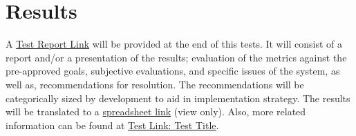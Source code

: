 
\section{Results}
\label{sec:sec011}

A \hyperlink{}{Test Report Link} will be provided at the end of this tests. It will consist of a report and/or a presentation of the results; evaluation of the metrics against the pre-approved goals, subjective evaluations, and specific issues of the system, as well as, recommendations for resolution. The recommendations will be categorically sized by development to aid in implementation strategy. The results will be translated to a \hyperlink{}{spreadsheet link} (view only). Also, more related information can be found at \hyperlink{}{Test Link: Test Title}.